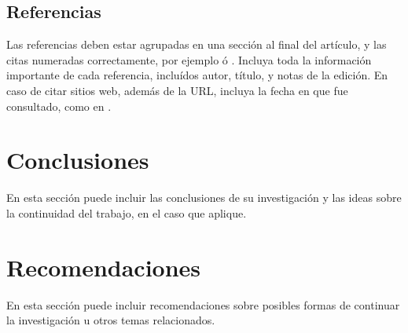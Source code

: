 \documentclass[a4paper,10pt,twocolumn]{article}
\begin{document}
	\subsection{Referencias}
  	Las referencias deben estar agrupadas en una sección al final del artículo,
  	y las citas numeradas correctamente, por ejemplo \cite{knuth} ó \cite{goedel}.
  	Incluya toda la información importante de cada referencia, incluídos autor,
  	título, y notas de la edición. En caso de citar sitios web, además
  	de la URL, incluya la fecha en que fue consultado, como en \cite{wiki}.




\section{Conclusiones}\label{sec:conc}

  En esta sección puede incluir las conclusiones de su investigación y las ideas
  sobre la continuidad del trabajo, en el caso que aplique.




\section{Recomendaciones}\label{sec:rec}

  En esta sección puede incluir recomendaciones sobre posibles formas de continuar
  la investigación u otros temas relacionados.

\end{document}
